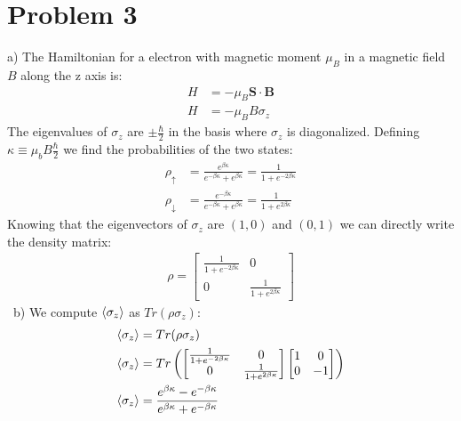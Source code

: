 \documentclass[a4paper,11pt]{article}
\numberwithin{equation}{section}
\newcommand{\bv}[1]{\mathbf{#1}}
\begin{document}
\section{Problem 3}
a) The Hamiltonian for a electron with magnetic moment $\mu_B$ in a magnetic field $B$ along the z axis is:
\begin{align}
 H&=-\mu_B\bv{S}\cdot\bv{B}\\
 H&=-\mu_B B\sigma_z
\end{align}
The eigenvalues of $\sigma_z$ are $\pm\frac{\hbar}{2}$ in the basis where $\sigma_z$ is diagonalized.
Defining $\kappa \equiv \mu_bB\frac{\hbar}{2}$ we find the probabilities of the two states:
\begin{align}
 \rho_\uparrow&=\frac{e^{\beta\kappa}}{e^{-\beta \kappa}+e^{\beta\kappa}}=\frac{1}{1+e^{-2\beta\kappa}}\\
 \rho_\downarrow&=\frac{e^{-\beta\kappa}}{e^{-\beta \kappa}+e^{\beta\kappa}}=\frac{1}{1+e^{2\beta\kappa}}
\end{align}
Knowing that the eigenvectors of $\sigma_z$ are $(1,0)$ and $(0,1)$ we can directly write the density matrix:
\begin{gather}
\rho=
 \begin{bmatrix}
  \frac{1}{1+e^{-2\beta\kappa}} & 0\\
  0                             & \frac{1}{1+e^{2\beta\kappa}}
 \end{bmatrix}
\end{gather}
\
b) We compute $\braket{\sigma_z}$ as $Tr(\rho \sigma_z )$:
\begin{align}
 \braket{\sigma_z}&=Tr(\rho\sigma_z)\\
 \braket{\sigma_z}&=Tr\left(
  \begin{bmatrix}
  \frac{1}{1+e^{-2\beta\kappa}} & 0\\
  0                             & \frac{1}{1+e^{2\beta\kappa}}
 \end{bmatrix}
 \begin{bmatrix}
  1 & 0\\
  0 & -1
 \end{bmatrix}
 \right)\\
 \braket{\sigma_z}&=\frac{e^{\beta\kappa}-e^{-\beta\kappa}}{e^{\beta\kappa}+e^{-\beta\kappa}}
\end{align}
\end{document}
